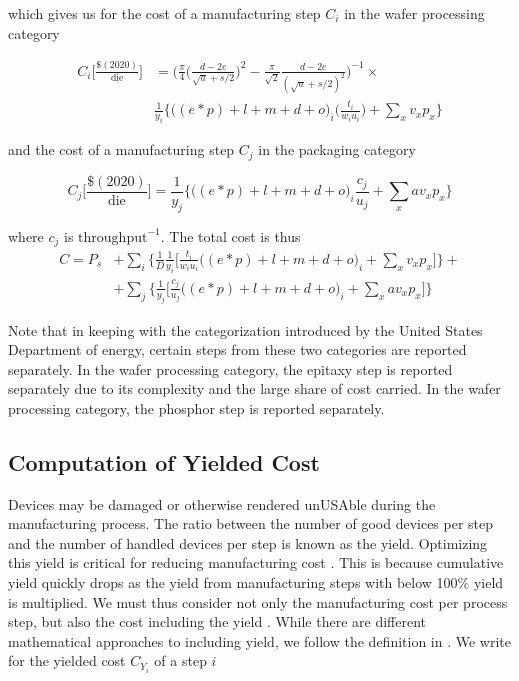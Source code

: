 \documentclass[10pt]{article}
\begin{document}
which gives us for the cost of a manufacturing step $C_i$ in the wafer processing category

\begin{equation}
\label{eqn:cost_wafer_full}
\begin{split}
    C_i \bigg[ \frac{ \$(2020) }{ \text{die} } \bigg] &= \bigg (  \frac{\pi}{4}  \bigg ( \frac{d-2e}{\sqrt{a}+s/2} \bigg ) ^2 - \frac{\pi}{\sqrt{2}}\frac{d-2e}{(\sqrt{a}+s/2)^2} \bigg )^{-1} \times \\
    &  \frac{1}{y_i}  \bigg\{ \bigg((e*p) + l + m + d +o \bigg)_i \bigg( \frac{t_i}{w_i u_i} \bigg) + \sum_{x} v_x p_x \bigg\}
\end{split}
\end{equation}

and the cost of a manufacturing step $C_j$ in the packaging category

\begin{equation}
\label{eqn:cost_die}
    C_j \bigg[ \frac{ \$(2020) }{ \text{die} } \bigg] = \frac{1}{y_j}  \bigg\{ \bigg((e*p) + l + m + d + o \bigg)_i  \frac{c_j}{u_j} + \sum_{x} a v_x p_x \bigg\}
\end{equation}

where $c_j$ is $\text{throughput}^{-1}$. The total cost is thus
\begin{equation}
\label{eqn:cost_total}
\begin{split}
    C= P_s &+ \sum_i \bigg \{ \frac{1}{D} \frac{1}{y_i} \bigg[ \frac{t_i}{w_i u_i} \bigg((e*p) + l + m + d +o \bigg)_i  + \sum_{x} v_x p_x \bigg] \bigg \} + \\
    & + \sum_j \bigg \{ \frac{1}{y_j} \bigg[ \frac{c_j}{u_j}  \bigg((e*p) + l + m + d + o \bigg)_i + \sum_{x} a v_x p_x \bigg ] \bigg\}
\end{split}
\end{equation}

Note that in keeping with the categorization introduced by the United States Department of energy, certain steps from these two categories are reported separately. In the wafer processing category, the epitaxy step is reported separately due to its complexity and the large share of cost carried. In the wafer processing category, the phosphor step is reported separately.

\subsection{Computation of Yielded Cost}

Devices may be damaged or otherwise rendered unUSAble during the manufacturing process. The ratio between the number of good devices per step and the number of handled devices per step is known as the yield. Optimizing this yield is critical for reducing manufacturing cost \cite{Kumar2006}. This is because cumulative yield quickly drops as the yield from manufacturing steps with below 100\% yield is multiplied. We must thus consider not only the manufacturing cost per process step, but also the cost including the yield \cite{becker2001use}\cite{becker2001using}. While there are different mathematical approaches to including yield, we follow the definition in  \cite{becker2001use}. We write for the yielded cost $C_{Y_i}$ of a step $i$
\end{document}
